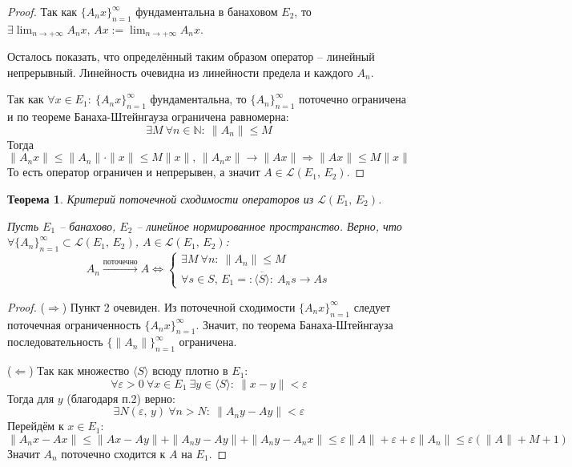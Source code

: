\documentclass[a4paper,12pt]{article}
\renewcommand{\leq}{\ensuremath{\leqslant}}
\theoremstyle{plain}
\newtheorem{theorem}{Теорема}[section]
\theoremstyle{definition}
\theoremstyle{remark}
\begin{document}
\begin{proof}
	Так как $\{A_nx\}_{n=1}^\infty$ фундаментальна в банаховом $E_2$, то $\exists \lim_{n \to +\infty} A_nx,\, Ax := \lim_{n \to +\infty}A_nx$.

	Осталось показать, что определённый таким образом оператор -- линейный непрерывный. Линейность очевидна из линейности предела и каждого $A_n$.

	Так как $\forall x \in E_1 :\: \{A_nx\}_{n=1}^\infty$ фундаментальна, то $\{A_n\}_{n=1}^\infty$ поточечно ограничена и по теореме Банаха-Штейнгауза ограничена равномерна:
	\[
		\exists M \: \forall n \in \mathbb{N} :\: \|A_n\| \leq M
	\]
	Тогда
	\[
		\|A_nx\| \leq \|A_n\|\cdot\|x\| \leq M\|x\|,\, \|A_nx\| \to \|Ax\| \Rightarrow \|Ax\| \leq M\|x\|
	\]
	То есть оператор ограничен и непрерывен, а значит $A \in \mathcal{L}(E_1,\, E_2)$.
\end{proof}

\begin{theorem}
	Критерий поточечной сходимости операторов из $\mathcal{L}(E_1,\,E_2)$.

	Пусть $E_1$ -- банахово, $E_2$ -- линейное нормированное пространство. Верно, что $\forall \{A_n\}_{n=1}^\infty \subset \mathcal{L}(E_1,\,E_2)$, $A \in \mathcal{L}(E_1,\,E_2)$:
	\[
		A_n \overset{\text{поточечно}}{\to} A \Leftrightarrow \begin{cases}
			\exists M \: \forall n :\: \|A_n\| \leq M \\
			\forall s \in S,\, E_1 =: \overline{\langle S\rangle}  :\: A_ns \to As
		\end{cases}
	\]
\end{theorem}

\begin{proof}
	($\Rightarrow$) Пункт 2 очевиден. Из поточечной сходимости $\{A_nx\}_{n=1}^\infty$ следует поточечная ограниченность $\{A_nx\}_{n=1}^\infty$. Значит, по теорема Банаха-Штейнгауза последовательность $\{\|A_n\|\}_{n=1}^\infty$ ограничена.

	($\Leftarrow$) Так как множество $\langle S\rangle$ всюду плотно в $E_1$:
	\[
		\forall \varepsilon > 0 \: \forall x \in E_1 \: \exists y \in \langle S\rangle :\: \|x - y\| < \varepsilon
	\]
	Тогда для $y$ (благодаря п.2) верно:
	\[
		\exists N(\varepsilon,\, y) \: \forall n > N :\: \|A_ny - Ay\| < \varepsilon
	\]
	Перейдём к $x \in E_1$:
	\[
		\|A_nx - Ax\| \leq \|Ax - Ay\| + \|A_ny - Ay\| + \|A_ny - A_nx\| \leq \varepsilon\|A\| + \varepsilon + \varepsilon\|A_n\| \leq \varepsilon(\|A\| + M + 1)
	\]
	Значит $A_n$ поточечно сходится к $A$ на $E_1$.
\end{proof}
\end{document}
